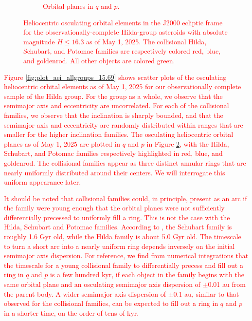 \documentclass[a4paper,fleqn]{cas-sc}
\begin{document}
\begin{linenumbers}
\begin{figure}
\begin{subfigure}[t]{0.48\textwidth}
        \caption{
        \textcolor{red}{Orbital planes in $q$ and $p$.}
}
 \label{fig:plot_qp_zoomout_allgroups_15.69}
    \end{subfigure}
\caption{\textcolor{red}{
Heliocentric osculating orbital elements in the J2000 ecliptic frame for the observationally-complete Hilda-group asteroids with absolute magnitude $H\leq16.3$ as of May 1, 2025.
The collisional Hilda, Schubart, and Potomac families are respectively colored red, blue, and goldenrod.
All other objects are colored green.
}}
\end{figure}

\textcolor{red}{
Figure \ref{fig:plot_aei_allgroups_15.69} shows scatter plots of the osculating \textcolor{red}{heliocentric} orbital elements 
\textcolor{red}{as of May 1, 2025} for our observationally complete sample of the Hilda group.
For the group as a whole, we observe that the semimajor axis and eccentricity are uncorrelated.
For each of the collisional families, we observe that the inclination is sharply bounded, and that the semimajor axis and eccentricity \textcolor{red}{are} randomly distributed within ranges that are smaller for the higher inclination families. 
}
\textcolor{red}{
The \textcolor{red}{osculating heliocentric orbital planes as of May 1, 2025} are plotted in \textcolor{red}{$q$ and $p$} in Figure \ref{fig:plot_qp_zoomout_allgroups_15.69},
}
\textcolor{red}{with the Hilda, Schubart, and Potomac families respectively highlighted in red, blue, and goldenrod.
The collisional families appear as three distinct annular rings that are nearly uniformly distributed around their centers.
We will interrogate this uniform appearance later.
}


\textcolor{red}{
It should be noted that collisional families could, in principle, present as an arc if the family were young enough that the orbit\textcolor{red}{al} planes were not sufficiently differentially precessed to \textcolor{red}{uniformly} fill a ring.
This is not the case with the Hilda, Schubart and Potomac families.
According to \citet{milani2017ages}, the Schubart family is roughly 1.6 Gyr old, while the Hilda family is about 5.0 Gyr old.
The timescale to turn a short arc into a nearly uniform ring depends inversely on the initial semimajor axis dispersion.
For reference, we find from numerical integrations that the timescale for a young collisional family to differentially precess and fill out a ring in \textcolor{red}{$q$ and $p$} is a few hundred \textcolor{red}{kyr}, if each object in the family begins with the same orbit\textcolor{red}{al plane} and an osculating semimajor axis dispersion of $\pm$0.01 au from the parent body.
A wider semimajor axis dispersion of $\pm$0.1 au, similar to that observed for the collisional families, can be expected to fill out a ring in \textcolor{red}{$q$ and $p$} in a shorter time, on the order of \textcolor{red}{tens of kyr}. 
}





\end{linenumbers}
\end{document}
